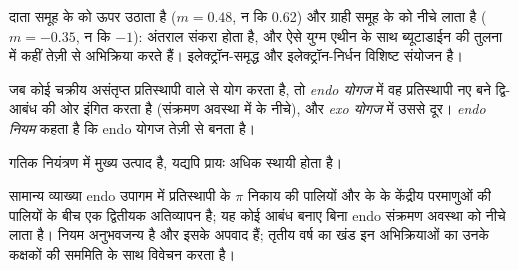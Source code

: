 दाता समूह  के  को ऊपर उठाता है ($m = 0.48$, न कि 0.62) और ग्राही समूह
 के  को नीचे लाता है ($m = -0.35$, न कि $-1$): अंतराल संकरा होता है, और ऐसे
युग्म एथीन के साथ ब्यूटाडाईन की तुलना में कहीं तेज़ी से अभिक्रिया करते हैं। इलेक्ट्रॉन-समृद्ध  और
इलेक्ट्रॉन-निर्धन  विशिष्ट संयोजन है।

\begin{definition}\label{def:b2:frontier-orbitals:endo}
जब कोई चक्रीय  असंतृप्त प्रतिस्थापी वाले  से योग करता है, तो
\emph{endo योगज} में वह प्रतिस्थापी नए
बने द्वि-आबंध की ओर इंगित करता है (संक्रमण अवस्था में  के नीचे), और \emph{exo
योगज} में उससे दूर। \emph{endo नियम} कहता है
कि endo योगज तेज़ी से बनता है।
\end{definition}

\begin{proposition}[endo नियम]\label{prop:b2:frontier-orbitals:endo}
गतिक नियंत्रण में  मुख्य उत्पाद है, यद्यपि 
प्रायः अधिक स्थायी होता है।
\end{proposition}

\admitted

सामान्य व्याख्या endo उपागम में प्रतिस्थापी के $\pi$ निकाय की पालियों और  के
 के केंद्रीय परमाणुओं की पालियों के बीच एक द्वितीयक अतिव्यापन है; यह
कोई आबंध बनाए बिना endo संक्रमण अवस्था को नीचे लाता है। नियम
अनुभवजन्य है और इसके अपवाद हैं; तृतीय वर्ष का खंड इन अभिक्रियाओं का उनके कक्षकों की
सममिति के साथ विवेचन करता है।

